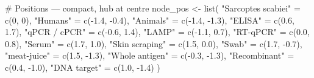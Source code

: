 \documentclass[
  letterpaper,
  DIV=11,
  numbers=noendperiod]{scrartcl}
\newenvironment{Shaded}{\begin{snugshade}}{\end{snugshade}}
\newcommand{\CommentTok}[1]{\textcolor[rgb]{0.37,0.37,0.37}{#1}}
\newcommand{\DecValTok}[1]{\textcolor[rgb]{0.68,0.00,0.00}{#1}}
\newcommand{\FloatTok}[1]{\textcolor[rgb]{0.68,0.00,0.00}{#1}}
\newcommand{\FunctionTok}[1]{\textcolor[rgb]{0.28,0.35,0.67}{#1}}
\newcommand{\NormalTok}[1]{\textcolor[rgb]{0.00,0.23,0.31}{#1}}
\newcommand{\OtherTok}[1]{\textcolor[rgb]{0.00,0.23,0.31}{#1}}
\newcommand{\SpecialCharTok}[1]{\textcolor[rgb]{0.37,0.37,0.37}{#1}}
\newcommand{\StringTok}[1]{\textcolor[rgb]{0.13,0.47,0.30}{#1}}
\begin{document}
\begin{Shaded}
\begin{Highlighting}[]
\CommentTok{\# Positions — compact, hub at centre}
\NormalTok{node\_pos }\OtherTok{\textless{}{-}} \FunctionTok{list}\NormalTok{(}
  \StringTok{"Sarcoptes scabiei"} \OtherTok{=} \FunctionTok{c}\NormalTok{(}\DecValTok{0}\NormalTok{, }\DecValTok{0}\NormalTok{),}
  \StringTok{"Humans"} \OtherTok{=} \FunctionTok{c}\NormalTok{(}\SpecialCharTok{{-}}\FloatTok{1.4}\NormalTok{, }\SpecialCharTok{{-}}\FloatTok{0.4}\NormalTok{),}
  \StringTok{"Animals"} \OtherTok{=} \FunctionTok{c}\NormalTok{(}\SpecialCharTok{{-}}\FloatTok{1.4}\NormalTok{, }\SpecialCharTok{{-}}\FloatTok{1.3}\NormalTok{),}
  \StringTok{"ELISA"} \OtherTok{=} \FunctionTok{c}\NormalTok{(}\FloatTok{0.6}\NormalTok{, }\FloatTok{1.7}\NormalTok{),}
  \StringTok{"qPCR / cPCR"} \OtherTok{=} \FunctionTok{c}\NormalTok{(}\SpecialCharTok{{-}}\FloatTok{0.6}\NormalTok{, }\FloatTok{1.4}\NormalTok{),}
  \StringTok{"LAMP"} \OtherTok{=} \FunctionTok{c}\NormalTok{(}\SpecialCharTok{{-}}\FloatTok{1.1}\NormalTok{, }\FloatTok{0.7}\NormalTok{),}
  \StringTok{"RT{-}qPCR"} \OtherTok{=} \FunctionTok{c}\NormalTok{(}\FloatTok{0.0}\NormalTok{, }\FloatTok{0.8}\NormalTok{),}
  \StringTok{"Serum"} \OtherTok{=} \FunctionTok{c}\NormalTok{(}\FloatTok{1.7}\NormalTok{, }\FloatTok{1.0}\NormalTok{),}
  \StringTok{"Skin scraping"} \OtherTok{=} \FunctionTok{c}\NormalTok{(}\FloatTok{1.5}\NormalTok{, }\FloatTok{0.0}\NormalTok{),}
  \StringTok{"Swab"} \OtherTok{=} \FunctionTok{c}\NormalTok{(}\FloatTok{1.7}\NormalTok{, }\SpecialCharTok{{-}}\FloatTok{0.7}\NormalTok{),}
  \StringTok{"meat{-}juice"} \OtherTok{=} \FunctionTok{c}\NormalTok{(}\FloatTok{1.5}\NormalTok{, }\SpecialCharTok{{-}}\FloatTok{1.3}\NormalTok{),}
  \StringTok{"Whole antigen"} \OtherTok{=} \FunctionTok{c}\NormalTok{(}\SpecialCharTok{{-}}\FloatTok{0.3}\NormalTok{, }\SpecialCharTok{{-}}\FloatTok{1.3}\NormalTok{),}
  \StringTok{"Recombinant"} \OtherTok{=} \FunctionTok{c}\NormalTok{(}\FloatTok{0.4}\NormalTok{, }\SpecialCharTok{{-}}\FloatTok{1.0}\NormalTok{),}
  \StringTok{"DNA target"} \OtherTok{=} \FunctionTok{c}\NormalTok{(}\FloatTok{1.0}\NormalTok{, }\SpecialCharTok{{-}}\FloatTok{1.4}\NormalTok{)}
\NormalTok{)}


\end{Highlighting}
\end{Shaded}
\end{document}
